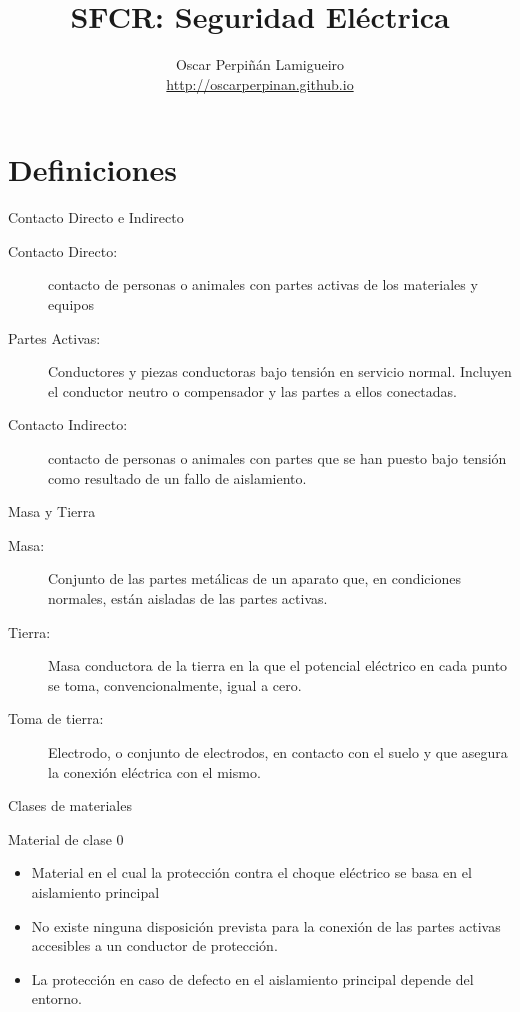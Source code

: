 \documentclass[xcolor={usenames,svgnames,dvipsnames}]{beamer}
\author{Oscar Perpiñán Lamigueiro \\ \url{http://oscarperpinan.github.io}}
\date{}
\title{SFCR: Seguridad Eléctrica}
\begin{document}
\maketitle


\section{Definiciones}
\label{sec:orgd1f05f3}

\begin{frame}[label={sec:orgf11c48e}]{Contacto Directo e Indirecto}
\begin{description}
\item[{Contacto Directo:}] contacto de personas o animales con partes
activas de los materiales y equipos

\item[{Partes Activas:}] Conductores y piezas conductoras bajo tensión en
servicio normal. Incluyen el conductor neutro o compensador y las
partes a ellos conectadas.

\item[{Contacto Indirecto:}] contacto de personas o animales con partes que
se han puesto bajo tensión como resultado de un fallo de aislamiento.
\end{description}
\end{frame}

\begin{frame}[label={sec:orgbd24bcc}]{Masa y Tierra}
\begin{description}
\item[{Masa:}] Conjunto de las partes metálicas de un aparato que, en
condiciones normales, están aisladas de las partes activas.

\item[{Tierra:}] Masa conductora de la tierra en la que el potencial
eléctrico en cada punto se toma, convencionalmente, igual a cero.

\item[{Toma de tierra:}] Electrodo, o conjunto de electrodos, en contacto
con el suelo y que asegura la conexión eléctrica con el mismo.
\end{description}
\end{frame}

\begin{frame}[label={sec:org77fa39a}]{Clases de materiales}
\begin{block}{Material de clase 0}
\begin{itemize}
\item Material en el cual la protección contra el choque eléctrico se basa
en el aislamiento principal
\item No existe ninguna disposición prevista para la conexión de las
partes activas accesibles a un conductor de protección.
\item La protección en caso de defecto en el aislamiento principal depende
del entorno.
\end{itemize}
\end{block}
\end{frame}
\end{document}
